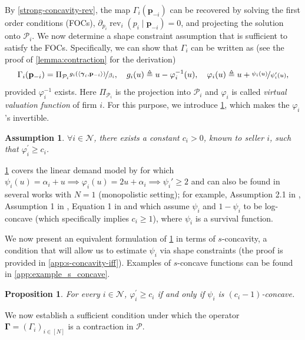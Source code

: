 \documentclass{article} %
\newtheorem{assumption}[theorem]{Assumption}
\newtheorem{proposition}[theorem]{Proposition}
\begin{document}
By \cref{strong-concavity-rev}, the map $\Gamma_i(\mathbf{p}_{-i})$ can be recovered by solving the first order conditions (FOCs), $\partial_{p_i}\operatorname{rev}_i(p_i \mid \mathbf{p}_{-i})=0$, and projecting the solution onto $\mathcal{P}_i$. We now determine a shape constraint assumption that is sufficient to satisfy the FOCs. Specifically, we can show that $\Gamma_i$ can be written as (see the proof of \cref{lemma:contraction} for the derivation)
$$
\textstyle \Gamma_i(\mathbf{p}_{-i}) = \Pi_{\mathcal{P}_i}\nicefrac{g_i(\langle\boldsymbol{\gamma}_i, \mathbf{p}_{-i}\rangle)}{\beta_i},\quad g_i(u) \triangleq  u- \varphi_i^{-1}(u), \quad \varphi_i (u) \triangleq  u + \nicefrac{\psi_i(u)}{\psi_i^{\prime}(u)},
$$
provided $\varphi_i^{-1}$ exists. Here $\Pi_{\mathcal{P}_i}$ is the projection into $\mathcal{P}_i$ and $\varphi_i$ is called \emph{virtual valuation function} of firm $i$. For this purpose, we introduce \cref{ass:valuation_i}, which makes the $\varphi_i$'s invertible.

\begin{assumption}\label{ass:valuation_i}
$\forall i \in \mathcal{N}$, there exists a constant $c_i>0$, known to seller $i$, such that $\varphi_i^{\prime}\geq c_i$.
\end{assumption}
\noindent
\cref{ass:valuation_i} covers the linear demand model by \cite{li2024lego} for which $\psi_i(u)=\alpha_i+u \implies \varphi_i(u)=2u+ \alpha_i \implies \psi_i'\geq 2$ and can also be found in several works with $N=1$ (monopolistic setting); for example, Assumption 2.1 in \cite{fan2024policy}, Assumption 1 in \cite{chen2018robust}, Equation 1 in \cite{cole2014sample} and \cite{golrezaei2019dynamic,javanmard2017perishability,javanmard2019dynamic} which assume $\psi_i$ and $1-\psi_i$ to be log-concave (which specifically implies $c_{i}\geq 1$), where $\psi_i$ is a survival function.

We now present an equivalent formulation of \cref{ass:valuation_i} in terms of $s$-concavity, a condition that will allow us to estimate $\psi_i$ via shape constraints (the proof is provided in \cref{app:s-concavity-iff}). Examples of $s$-concave functions can be found in \cref{app:example_s_concave}.

\begin{proposition}\label{prop:s-concavity-iff}
For every $i \in \mathcal{N}$, $\varphi_i^{\prime}\geq c_i$ if and only if $\psi_i$ is $(c_i-1)$-concave.
\end{proposition}

We now establish a sufficient condition under which the operator $\boldsymbol{\Gamma}=(\Gamma_i)_{i \in [N]}$ is a contraction in $\mathcal{P}$.
\end{document}

